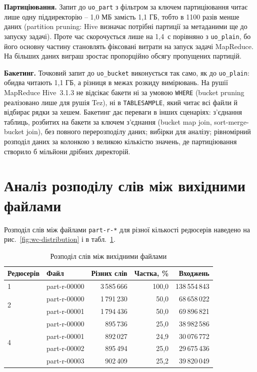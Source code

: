 \documentclass{iasa-lab}
\begin{document}
\textbf{Партиціювання.} Запит до \texttt{uo\_part} з фільтром за ключем партиціювання читає лише одну піддиректорію -- 1,0 МБ замість 1,1 ГБ, тобто в 1100 разів менше даних (partition pruning: Hive визначає потрібні партиції за метаданими ще до запуску задачі). Проте час скорочується лише на 1,4~с порівняно з \texttt{uo\_plain}, бо його основну частину становлять фіксовані витрати на запуск задачі MapReduce. На більших даних виграш зростає пропорційно обсягу пропущених партицій.

\textbf{Бакетинг.} Точковий запит до \texttt{uo\_bucket} виконується так само, як до \texttt{uo\_plain}: обидва читають 1,1 ГБ, а різниця в межах розкиду вимірювань. На рушії MapReduce Hive~3.1.3 не відсікає бакети ні за умовою \texttt{WHERE} (bucket pruning реалізовано лише для рушія Tez), ні в \texttt{TABLESAMPLE}, який читає всі файли й відбирає рядки за хешем. Бакетинг дає переваги в інших сценаріях: з'єднання таблиць, розбитих на бакети за ключем з'єднання (bucket map join, sort-merge-bucket join), без повного перерозподілу даних; вибірки для аналізу; рівномірний розподіл даних за колонкою з великою кількістю значень, де партиціювання створило б мільйони дрібних директорій.

\section{Аналіз розподілу слів між вихідними файлами}

Розподіл слів між файлами \texttt{part-r-*} для різної кількості редюсерів наведено на рис.~\ref{fig:wc-distribution} і в табл.~\ref{tab:wc-distribution}.


\begin{table}[H]
  \caption{Розподіл слів між вихідними файлами}\label{tab:wc-distribution}
  \begin{tabularx}{\textwidth}{|l|X|r|r|r|}
    \hline
    Редюсерів & Файл & Різних слів & Частка, \% & Входжень \\
    \hline
    1 & part-r-00000 & 3\,585\,666 & 100,0 & 138\,554\,843 \\
    \hline
    \multirow{2}{*}{2} & part-r-00000 & 1\,791\,230 & 50,0 & 68\,658\,022 \\
     & part-r-00001 & 1\,794\,436 & 50,0 & 69\,896\,821 \\
    \hline
    \multirow{4}{*}{4} & part-r-00000 & 895\,736 & 25,0 & 38\,982\,586 \\
     & part-r-00001 & 892\,027 & 24,9 & 30\,076\,772 \\
     & part-r-00002 & 895\,494 & 25,0 & 29\,675\,436 \\
     & part-r-00003 & 902\,409 & 25,2 & 39\,820\,049 \\
    \hline
  \end{tabularx}
\end{table}
\end{document}
